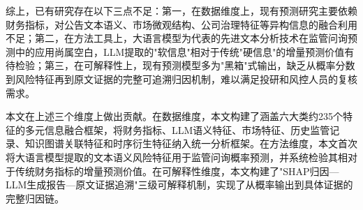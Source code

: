 综上，已有研究存在以下三点不足：第一，在数据维度上，现有预测研究主要依赖财务指标，对公告文本语义、市场微观结构、公司治理特征等异构信息的融合利用不足；第二，在方法工具上，大语言模型为代表的先进文本分析技术在监管问询预测中的应用尚属空白，LLM提取的"软信息"相对于传统"硬信息"的增量预测价值有待检验；第三，在可解释性上，现有预测模型多为"黑箱"式输出，缺乏从概率分数到风险特征再到原文证据的完整可追溯归因机制，难以满足投研和风控人员的复核需求。

本文在上述三个维度上做出贡献。在数据维度，本文构建了涵盖六大类约235个特征的多元信息融合框架，将财务指标、LLM语义特征、市场特征、历史监管记录、知识图谱关联特征和时序衍生特征纳入统一分析框架。在方法维度，本文首次将大语言模型提取的文本语义风险特征用于监管问询概率预测，并系统检验其相对于传统财务指标的增量预测价值。在可解释性维度，本文构建了"SHAP归因—LLM生成报告—原文证据追溯"三级可解释机制，实现了从概率输出到具体证据的完整归因链。